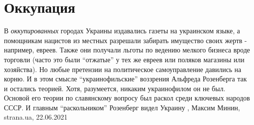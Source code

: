  
 
 
 
 
\chapter{Оккупация}

В \emph{оккупированных} городах Украины издавались газеты на украинском языке,
а помощникам нацистов из местных разрешали забирать имущество своих жертв -
например, евреев. Также они получали льготы по ведению мелкого бизнеса вроде
торговли (часто это были \enquote{отжатые} у тех же евреев или поляков магазины или
хозяйства).  Но любые претензии на политическое самоуправление давились на
корню. И в этом смысле \enquote{украинофильские} воззрения Альфреда Розенберга так и
остались теорией. Хотя, разумеется, никаким украинофилом он не был. Основой его
теории по славянскому вопросу был раскол среди ключевых народов СССР. И главным
\enquote{раскольником} Розенберг видел Украину 
  , Максим Минин, strana.ua, 22.06.2021
